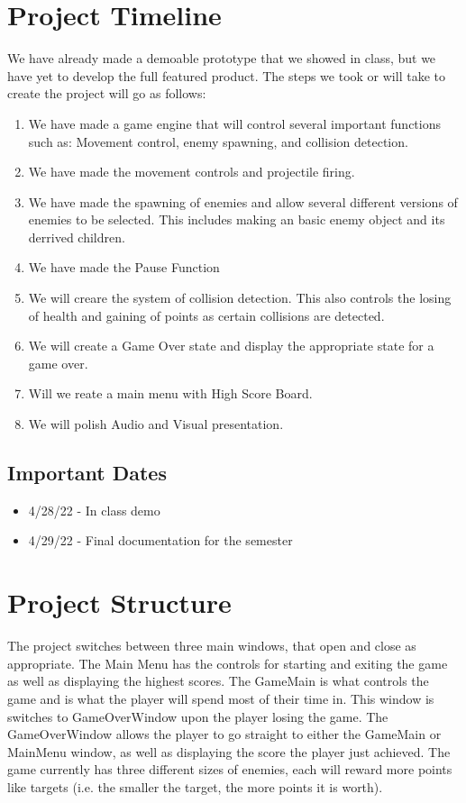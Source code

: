 \documentclass[10pt,conference,onecolumn,compsoc]{IEEEtran}
\begin{document}
\section{Project Timeline}
We have already made a demoable prototype that we showed in class, but we have yet to develop the full featured product. The steps we took or will take to create the project will go as follows: 
\begin{enumerate}
\item We have made a game engine that will control several important functions such as: Movement control, enemy spawning, and collision detection.
\item We have made the movement controls and projectile firing. 
\item We have made the spawning of enemies and allow several different versions of enemies to be selected. This includes making an basic enemy object and its derrived children.
\item We have made the Pause Function
\item We will creare the system of collision detection. This also controls the losing of health and gaining of points as certain collisions are detected. 
\item We will create a Game Over state and display the appropriate state for a game over.
\item Will we reate a main menu with High Score Board.
\item We will polish Audio and Visual presentation.
\end{enumerate}

\subsection{Important Dates}
\begin{itemize}
\item4/28/22 - In class demo
\item4/29/22 - Final documentation for the semester
\end{itemize}

\section{Project Structure}
The project switches between three main windows, that open and close as appropriate. The Main Menu has the controls for starting and exiting the game as well as displaying the highest scores. The GameMain is what controls the game and is what the player will spend most of their time in. This window is switches to GameOverWindow upon the player losing the game. The GameOverWindow allows the player to go straight to either the GameMain or MainMenu window, as well as displaying the score the player just achieved. The game currently has three different sizes of enemies, each will reward more points like  targets (i.e. the smaller the target, the more points it is worth).
\end{document}
